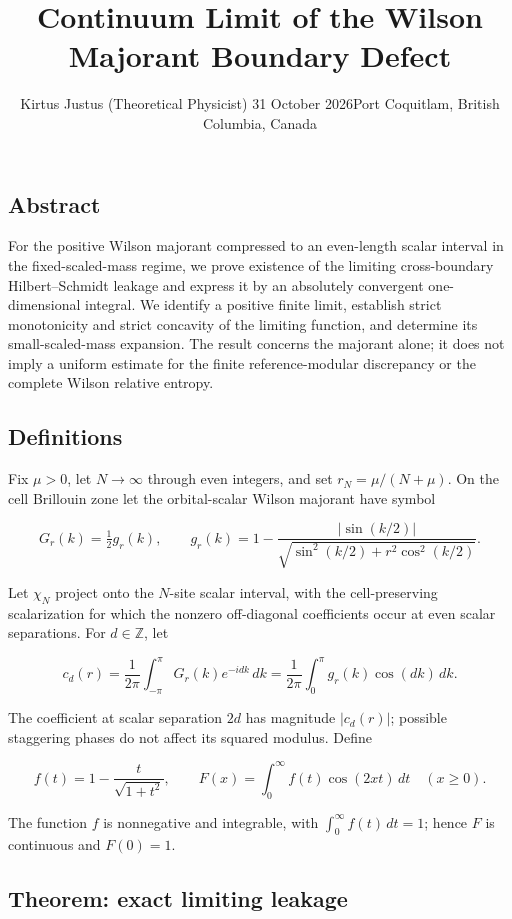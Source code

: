 \documentclass[
  10pt,
  a4paper,
]{article}
\title{Continuum Limit of the Wilson Majorant Boundary Defect}
\author{Kirtus Justus (Theoretical Physicist) \textbullet{} 31 October 2026\tabularnewline Port Coquitlam, British Columbia, Canada}
\date{}
\begin{document}
\maketitle

\subsection{Abstract}\label{abstract}

For the positive Wilson majorant compressed to an even-length scalar interval in the fixed-scaled-mass regime, we prove existence of the limiting cross-boundary Hilbert--Schmidt leakage and express it by an absolutely convergent one-dimensional integral. We identify a positive finite limit, establish strict monotonicity and strict concavity of the limiting function, and determine its small-scaled-mass expansion. The result concerns the majorant alone; it does not imply a uniform estimate for the finite reference-modular discrepancy or the complete Wilson relative entropy.

\subsection{Definitions}\label{definitions}

Fix \(\mu>0\), let \(N\to\infty\) through even integers, and set \(r_N=\mu/(N+\mu)\). On the cell Brillouin zone let the orbital-scalar Wilson majorant have symbol

\[
G_r(k)=\tfrac12 g_r(k),\qquad
g_r(k)=1-\frac{|\sin(k/2)|}{\sqrt{\sin^2(k/2)+r^2\cos^2(k/2)}}.
\]

Let \(\chi_N\) project onto the \(N\)-site scalar interval, with the cell-preserving scalarization for which the nonzero off-diagonal coefficients occur at even scalar separations. For \(d\in\mathbb Z\), let

\[
c_d(r)=\frac{1}{2\pi}\int_{-\pi}^{\pi}G_r(k)e^{-idk}\,dk
=\frac1{2\pi}\int_0^\pi g_r(k)\cos(dk)\,dk.
\]

The coefficient at scalar separation \(2d\) has magnitude \(|c_d(r)|\); possible staggering phases do not affect its squared modulus. Define

\[
f(t)=1-\frac{t}{\sqrt{1+t^2}},\qquad
F(x)=\int_0^\infty f(t)\cos(2xt)\,dt\quad(x\ge0).
\]

The function \(f\) is nonnegative and integrable, with \(\int_0^\infty f(t)\,dt=1\); hence \(F\) is continuous and \(F(0)=1\).

\subsection{Theorem: exact limiting leakage}\label{theorem-exact-limiting-leakage}
\end{document}
